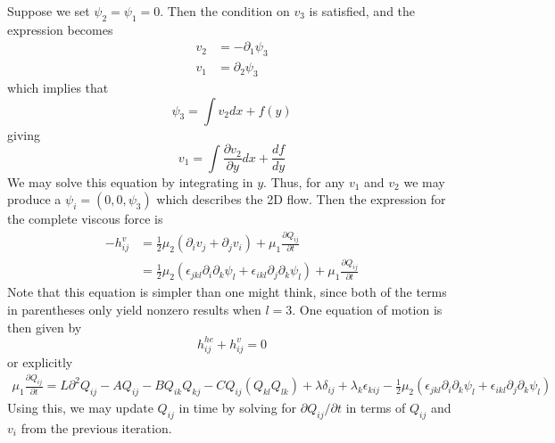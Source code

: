 \documentclass[reqno]{article}
\begin{document}
	Suppose we set $\psi_2 = \psi_1 = 0$. Then the condition on $v_3$ is satisfied, and the expression becomes
	\begin{equation}
	\begin{split}
		v_2 &= -\partial_1 \psi_3 \\
		v_1 &= \partial_2 \psi_3
	\end{split}
	\end{equation}
	which implies that
	\begin{equation}
		\psi_3 = \int v_2 dx + f(y)
	\end{equation}
	giving
	\begin{equation}
		v_1 = \int \frac{\partial v_2}{\partial y} dx + \frac{df}{dy}
	\end{equation}
	We may solve this equation by integrating in $y$. Thus, for any $v_1$ and $v_2$ we may produce a $\psi_i = (0, 0, \psi_3)$ which describes the 2D flow. Then the expression for the complete viscous force is
	\begin{equation}
	\begin{split}
		-h^v_{ij} &= \frac{1}{2}\mu_2 (\partial_i v_j + \partial_j v_i) + \mu_1 \frac{\partial Q_{ij}}{\partial t} \\
		&= \frac{1}{2}\mu_2 (\epsilon_{jkl} \partial_i \partial_k \psi_l +  \epsilon_{ikl} \partial_j \partial_k \psi_l) + \mu_1 \frac{\partial Q_{ij}}{\partial t}
	\end{split}
	\end{equation}
	Note that this equation is simpler than one might think, since both of the terms in parentheses only yield nonzero results when $l = 3$. 
	One equation of motion is then given by 
	\begin{equation}
		h^{he}_{ij} + h^{v}_{ij} = 0
	\end{equation}
	or explicitly
	\begin{multline}\label{eq:forceeq}
		\mu_1 \frac{\partial Q_{ij}}{\partial t} = L\partial^2 Q_{ij} - A Q_{ij} - BQ_{ik}Q_{kj} - C Q_{ij} (Q_{kl}Q_{lk}) + \lambda\delta_{ij} + \lambda_k \epsilon_{kij} - \frac{1}{2}\mu_2 (\epsilon_{jkl} \partial_i \partial_k \psi_l +  \epsilon_{ikl} \partial_j \partial_k \psi_l)
	\end{multline}
	Using this, we may update $Q_{ij}$ in time by solving for $\partial Q_{ij}/\partial t$ in terms of $Q_{ij}$ and $v_i$ from the previous iteration.
	
\end{document}
